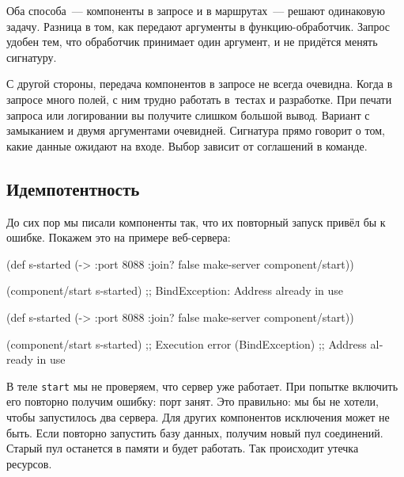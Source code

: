 Оба способа~--- компоненты в запросе и в маршрутах~--- решают одинаковую
задачу. Разница в том, как передают аргументы в функцию-обработчик. Запрос
удобен тем, что обработчик принимает один аргумент, и не придётся менять
сигнатуру.

С другой стороны, передача компонентов в запросе не всегда очевидна. Когда в
запросе много полей, с ним трудно работать в~тестах и разработке. При печати
запроса или логировании вы получите слишком большой вывод. Вариант с замыканием
и двумя аргументами очевидней. Сигнатура прямо говорит о том, какие данные
ожидают на входе. Выбор зависит от соглашений в команде.

\subsection{Идемпотентность}

До сих пор мы писали компоненты так, что их повторный запуск привёл бы к
ошибке. Покажем это на примере веб-сервера:

\ifnarrow

\begin{english}
  \begin{clojure}
(def s-started
  (-> {:port 8088 :join? false}
      make-server
      component/start))

(component/start s-started)
;; BindException: Address already in use
  \end{clojure}
\end{english}

\else

\begin{english}
  \begin{clojure}
(def s-started (-> {:port 8088 :join? false}
                    make-server
                    component/start))

(component/start s-started)
;; Execution error (BindException)
;; Address already in use
  \end{clojure}
\end{english}

\fi

В теле \verb|start| мы не проверяем, что сервер уже работает. При попытке
включить его повторно получим ошибку: порт занят. Это правильно: мы бы не
хотели, чтобы запустилось два сервера. Для других компонентов исключения может
не быть. Если повторно запустить базу данных, получим новый пул
соединений. Старый пул останется в памяти и будет работать. Так происходит
утечка ресурсов.

